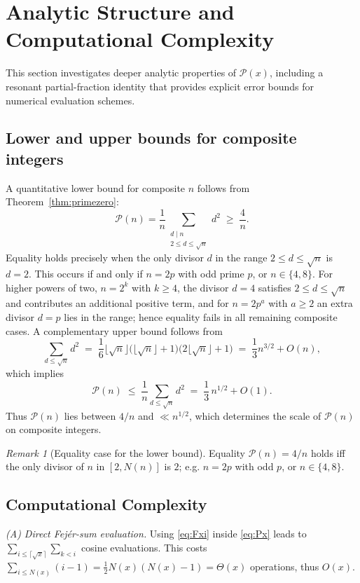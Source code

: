 \documentclass[11pt,a4paper]{amsart}
\theoremstyle{plain}
\theoremstyle{definition}
\theoremstyle{remark}
\newtheorem{remark}[theorem]{Remark}
\begin{document}
\section{Analytic Structure and Computational Complexity}

This section investigates deeper analytic properties of $\mathcal{P}(x)$, including a resonant partial-fraction identity that provides explicit error bounds for numerical evaluation schemes.

\subsection{Lower and upper bounds for composite integers}
A quantitative lower bound for composite $n$ follows from Theorem~\ref{thm:primezero}:
\[
\mathcal{P}(n) = \frac{1}{n} \sum_{\substack{d\mid n \\ 2 \le d \le \sqrt{n}}} d^2 \;\ge\; \frac{4}{n}.
\]
Equality holds precisely when the only divisor $d$ in the range $2\le d\le \sqrt{n}$ is $d=2$. This occurs if and only if $n=2p$ with odd prime $p$, or $n\in\{4,8\}$. For higher powers of two, $n=2^k$ with $k\ge 4$, the divisor $d=4$ satisfies $2\le d\le\sqrt{n}$ and contributes an additional positive term, and for $n=2p^a$ with $a\ge 2$ an extra divisor $d=p$ lies in the range; hence equality fails in all remaining composite cases. A complementary upper bound follows from
\[
\sum_{d\le \sqrt{n}} d^2 \;=\; \frac{1}{6}\bigl\lfloor\sqrt{n}\bigr\rfloor\bigl(\bigl\lfloor\sqrt{n}\bigr\rfloor+1\bigr)\bigl(2\bigl\lfloor\sqrt{n}\bigr\rfloor+1\bigr)
\;=\; \frac{1}{3}n^{3/2} + O(n),
\]
which implies
\[
\mathcal{P}(n) \;\le\; \frac{1}{n}\sum_{d\le \sqrt{n}} d^2
\;=\; \frac{1}{3}\,n^{1/2} + O(1).
\]
Thus $\mathcal{P}(n)$ lies between $4/n$ and $\ll n^{1/2}$, which determines the scale of $\mathcal{P}(n)$ on composite integers.

\begin{remark}[Equality case for the lower bound]
Equality $\mathcal{P}(n)=4/n$ holds iff the only divisor of $n$ in $[2,N(n)]$ is $2$; e.g. $n=2p$ with odd $p$, or $n\in\{4,8\}$.
\end{remark}

\subsection{Computational Complexity}

\smallskip
\noindent\textit{(A) Direct Fejér-sum evaluation.}
Using \eqref{eq:Fxi} inside \eqref{eq:Px} leads to $\sum_{i\le \lceil\sqrt{x}\rceil}\sum_{k<i}$ cosine evaluations.
This costs $\sum_{i\le N(x)}(i-1)=\tfrac12N(x)(N(x)-1)=\Theta(x)$ operations, thus $O(x)$.
\end{document}
